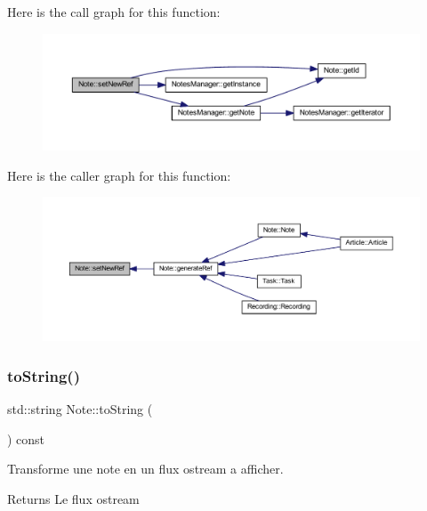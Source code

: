 Here is the call graph for this function\+:\nopagebreak
\begin{figure}[H]
\begin{center}
\leavevmode
\includegraphics[width=350pt]{class_note_a3af2edc369310b9f122bd1fd6dbfa717_cgraph}
\end{center}
\end{figure}
Here is the caller graph for this function\+:\nopagebreak
\begin{figure}[H]
\begin{center}
\leavevmode
\includegraphics[width=350pt]{class_note_a3af2edc369310b9f122bd1fd6dbfa717_icgraph}
\end{center}
\end{figure}
\mbox{\label{class_note_a1bd4acfbde0b71d05fd7d4ca889bca2b}} 
\subsubsection{\texorpdfstring{to\+String()}{toString()}}
{\footnotesize\ttfamily std\+::string Note\+::to\+String (\begin{DoxyParamCaption}{ }\end{DoxyParamCaption}) const\hspace{0.3cm}{\ttfamily [virtual]}}



Transforme une note en un flux ostream a afficher. 

\begin{DoxyReturn}{Returns}
Le flux ostream 
\end{DoxyReturn}


